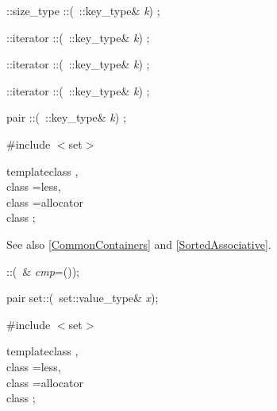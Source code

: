 \begin{multicols}{4}
\bA::size_type\newline
\bA::(\const\ \bA::key_type\& \emph{k}) \const;

\bA::iterator\enskip 
\bA::(\const\ \bA::key_type\& \emph{k}) \const;

\bA::iterator\newline
\bA::(\const\ \bA::key_type\& \emph{k}) \const;

\bA::iterator\newline
\bA::(\const\ \bA::key_type\& \emph{k}) \const;

pair 
   \newline
\bA::(\const\ \bA::key_type\& \emph{k}) \const;

 \label{Set}

\#include $<$set$>$

\begin{templdec}
template\<class \Key,\\
\phantom{template\<}class \Compare=less\TP{\Key},\\
\phantom{template\<}class \Alloc=allocator\>\\
class ;\\
\end{templdec}

See also \ref{CommonContainers} and \ref{SortedAssociative}.

::(\const\ \Compare\& \emph{cmp}=\Compare());

pair\newline
set::(\const\  set::value_type\& \emph{x});

 \label{Multiset}

\#include $<$set$>$

\begin{templdec}
template\<class \Key,\\
\phantom{template\<}class \Compare=less\TP{\Key},\\
\phantom{template$<$}class \Alloc=allocator\>\\
class ;\\
\end{templdec}


\end{multicols}
